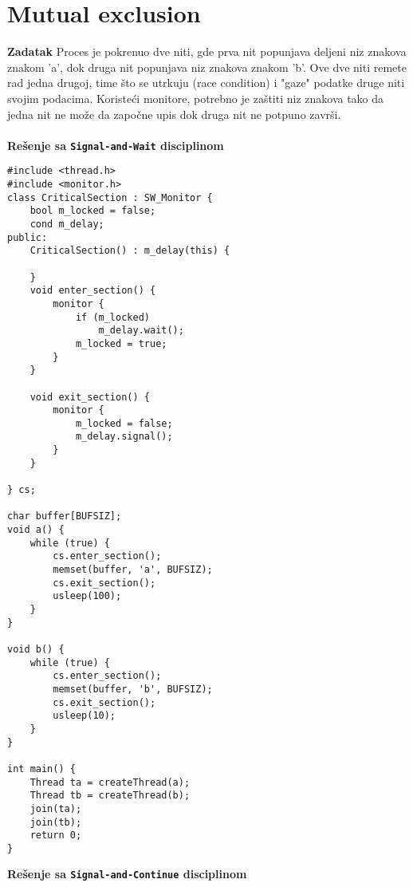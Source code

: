 \clearpage
\section{Mutual exclusion}
\textbf{\large Zadatak} Proces je pokrenuo dve niti, gde prva nit popunjava deljeni niz znakova znakom 'a', dok druga nit popunjava niz znakova znakom 'b'. Ove dve niti remete rad jedna drugoj, time \v{s}to se utrkuju (race condition) i "gaze" podatke druge niti svojim podacima. Koriste\'{c}i monitore, potrebno je za\v{s}titi niz znakova tako da jedna nit ne mo\v{z}e da zapo\v{c}ne upis dok druga nit ne potpuno zavr\v{s}i.
\\\\
\textbf{Re\v{s}enje sa \texttt{Signal-and-Wait} disciplinom}
\begin{lstlisting}
#include <thread.h>
#include <monitor.h>
class CriticalSection : SW_Monitor {
    bool m_locked = false;
    cond m_delay;
public:
    CriticalSection() : m_delay(this) {

    }
    void enter_section() {
        monitor {
            if (m_locked) 
                m_delay.wait();
            m_locked = true;
        }
    }

    void exit_section() {
        monitor {
            m_locked = false;
            m_delay.signal();
        }
    }

} cs;

char buffer[BUFSIZ];
void a() {
    while (true) {
        cs.enter_section();
        memset(buffer, 'a', BUFSIZ);
        cs.exit_section();
        usleep(100);
    }
}

void b() {
    while (true) {
        cs.enter_section();
        memset(buffer, 'b', BUFSIZ);
        cs.exit_section();
        usleep(10);
    }
}

int main() {
    Thread ta = createThread(a);
    Thread tb = createThread(b);
    join(ta);
    join(tb);
    return 0;
}

\end{lstlisting}
\newpage
\textbf{Re\v{s}enje sa \texttt{Signal-and-Continue} disciplinom}
